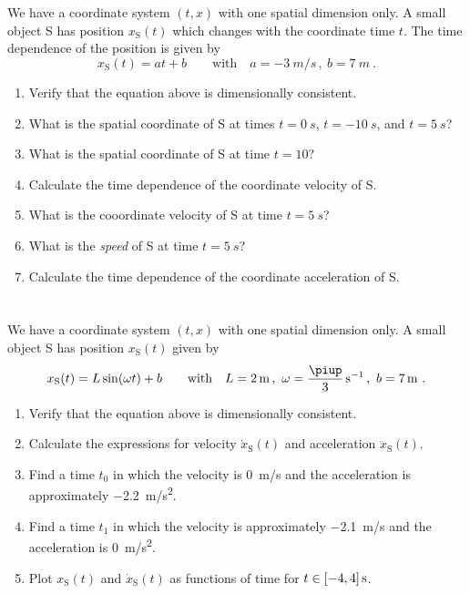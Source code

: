 \documentclass[a4paper,12pt,%
onecolumn,oneside,%
british%
]{memoir}
\newcommand*{\pu}{\piup}%
\DeclarePairedDelimiter\clcl{[}{]}
\renewcommand*{\|}[1][]{\nonscript\:#1\vert\nonscript\:\mathopen{}}
\newcommand*{\yti}{t_{0}}
\newcommand*{\ytf}{t_{1}}
\newcommand*{\cx}[1]{x_{\text{#1}}}
\newcommand*{\vx}[1]{\dot{x}_{\text{#1}}}
\newcommand*{\ax}[1]{\ddot{x}_{\text{#1}}}
\begin{document}
\section{}
\label{sec:1D_motion}

We have a coordinate system $(t,x)$ with one spatial dimension only. A small object S has position $\cx{S}(t)$ which changes with the coordinate time $t$. The time dependence of the position is given by
\begin{equation*}
  \cx{S}(t) = a t + b
  \qquad\text{with}\quad
  a = \qty{-3}{m/s} \,,\ 
  b = \qty{7}{m} \ .
\end{equation*}
\begin{enumerate}[exerc]
\item Verify that the equation above is dimensionally consistent.
\item What is the spatial coordinate of S at times $t=\qty{0}{s}$, $t=\qty{-10}{s}$, and $t=\qty{5}{s}$?
\item What is the spatial coordinate of S at time $t=10$?

\item Calculate the time dependence of the coordinate velocity of S.
\item What is the cooordinate velocity of S at time $t=\qty{5}{s}$?
\item What is the \emph{speed} of S at time $t=\qty{5}{s}$?
\item Calculate the time dependence of the coordinate acceleration of S.
\end{enumerate}

\section{}
\label{sec:1D_motion_b}

We have a coordinate system $(t,x)$ with one spatial dimension only. A small object S has position $\cx{S}(t)$ given by
\begin{equation*}
  \cx{S}(t) = L \sin(\omega t) + b
  \qquad\text{with}\quad
  L = \qty{2}{m} \,,\
  \omega = \frac{\pu}{3}\,\unit{s^{-1}} \,,\
  b = \qty{7}{m}  \ .
\end{equation*}
\begin{enumerate}[exerc]
\item Verify that the equation above is dimensionally consistent.
\item Calculate the expressions for velocity $\vx{S}(t)$ and acceleration $\ax{S}(t)$.
\item Find a time $\yti$ in which the velocity is \qty{0}{m/s} and the acceleration is approximately \qty{-2.2}{m/s^2}.
\item Find a time $\ytf$ in which the velocity is approximately \qty{-2.1}{m/s} and the acceleration is \qty{0}{m/s^2}.
\item Plot $\cx{S}(t)$ and $\vx{S}(t)$ as functions of time for $t \in \clcl{-4, 4}\,\unit{s}$.
\end{enumerate}
\end{document}
